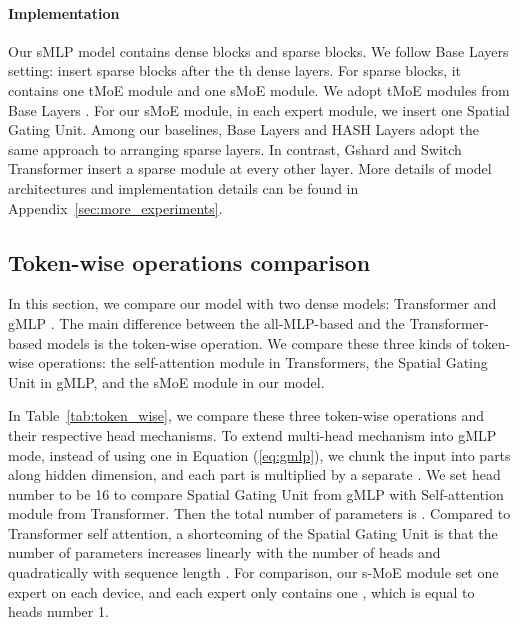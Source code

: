 \documentclass{article}
\begin{document}
\paragraph{Implementation}
Our sMLP model contains  dense blocks and  sparse blocks. We follow Base Layers \citep{baselayer} setting: insert sparse blocks after the th dense layers. For sparse blocks, it contains one tMoE module and one sMoE module. We adopt tMoE modules from Base Layers \citep{baselayer}. For our sMoE module, in each expert module, we insert one Spatial Gating Unit. Among our baselines, Base Layers \citep{baselayer} and HASH Layers \citep{hashlayer} adopt the same approach to arranging sparse layers. In contrast, Gshard \citep{gshard} and Switch Transformer \citep{switch} insert a sparse module at every other layer. More details of model architectures and implementation details can be found in Appendix~\ref{sec:more_experiments}. 










\vspace{-2mm}
\subsection{Token-wise operations comparison}
\label{sec:dense_model_comparision}



In this section, we compare our model with two dense models: Transformer \citep{vaswani2017attention} and gMLP \citep{gmlp}. The main difference between the all-MLP-based and the Transformer-based models is the token-wise operation. We compare these three kinds of token-wise operations: the self-attention module in Transformers, the Spatial Gating Unit in gMLP, and the sMoE module in our model. 


In Table~\ref{tab:token_wise}, we compare these three token-wise operations and their respective head mechanisms. To extend multi-head mechanism into gMLP mode, instead of using one  in Equation (\ref{eq:gmlp}), we chunk the input  into  parts along hidden dimension, and each part is multiplied by a separate . We set head number  to be 16 to compare Spatial Gating Unit from gMLP with Self-attention module from Transformer. Then the total number of parameters is . Compared to Transformer self attention, a shortcoming of the Spatial Gating Unit is that the number of parameters increases linearly with the number of heads  and quadratically with sequence length . 
For comparison, our s-MoE module set one expert on each device, and each expert only contains one , which is equal to heads number 1. 
\end{document}
